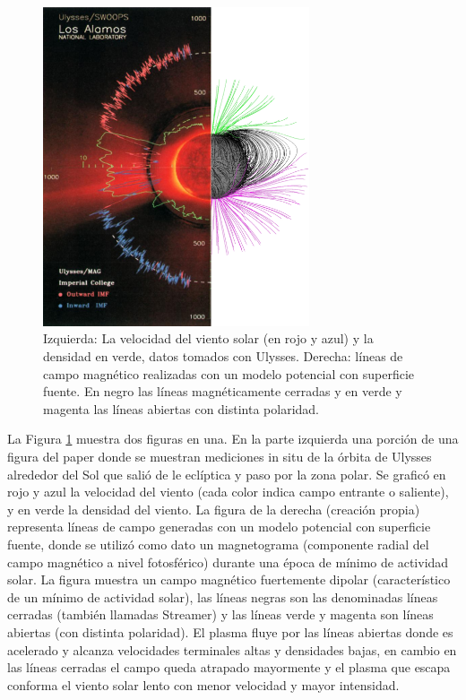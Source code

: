 \documentclass[a4paper,11pt]{report}
\begin{document}
\begin{figure}[h]
\begin{center}
\includegraphics[width=0.7\textwidth]{figuras/mezcla_pfss_ulysses.png}
\end{center}
\caption{Izquierda: La velocidad del viento solar (en rojo y azul) y la densidad en verde, datos tomados con Ulysses. Derecha: líneas de campo magnético realizadas con un modelo potencial con superficie fuente. En negro las líneas magnéticamente cerradas y en verde y magenta las líneas abiertas con distinta polaridad.}
\label{ulysses}
\end{figure}

La Figura \ref{ulysses} muestra dos figuras en una. En la parte izquierda una porción de una figura del paper \citet{mccomas_2000} donde se muestran mediciones in situ de la órbita de Ulysses alrededor del Sol que salió de le eclíptica y paso por la zona polar. Se graficó en rojo y azul la velocidad del viento (cada color indica campo entrante o saliente), y en verde la densidad del viento. La figura de la derecha (creación propia) representa líneas de campo generadas con un modelo potencial con superficie fuente, donde se utilizó como dato un magnetograma (componente radial del campo magnético a nivel fotosférico) durante una época de mínimo de actividad solar. La figura muestra un campo magnético fuertemente dipolar (característico de un mínimo de actividad solar), las líneas negras son las denominadas líneas cerradas (también llamadas Streamer) y las líneas verde y magenta son líneas abiertas (con distinta polaridad). El plasma fluye por las líneas abiertas donde es acelerado y alcanza velocidades terminales altas y densidades bajas, en cambio en las líneas cerradas el campo queda atrapado mayormente y el plasma que escapa conforma el viento solar lento con menor velocidad y mayor intensidad. %
\end{document}

